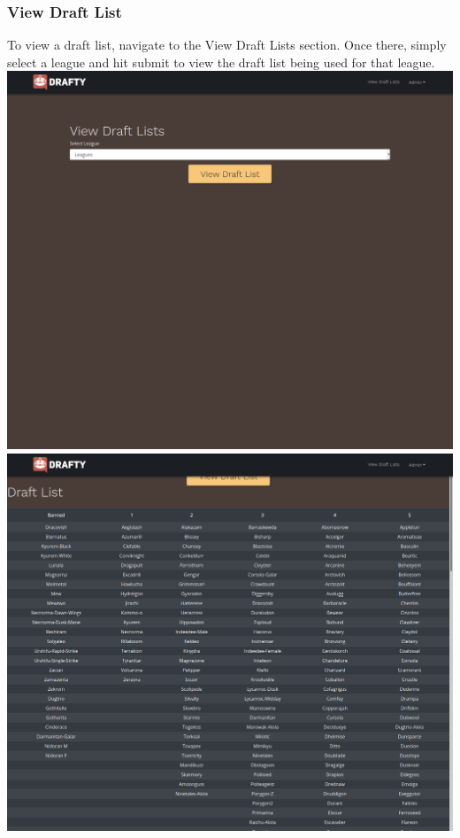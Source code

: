 \documentclass{article}
\begin{document}
  \subsubsection*{View Draft List}
  To view a draft list, navigate to the View Draft Lists section. Once there, simply select a league and hit submit to view the draft list being used for that league.\\
  \includegraphics[scale=.3]{view_dl.png}
  \includegraphics[scale=.3]{view_dl2.png}
\end{document}
